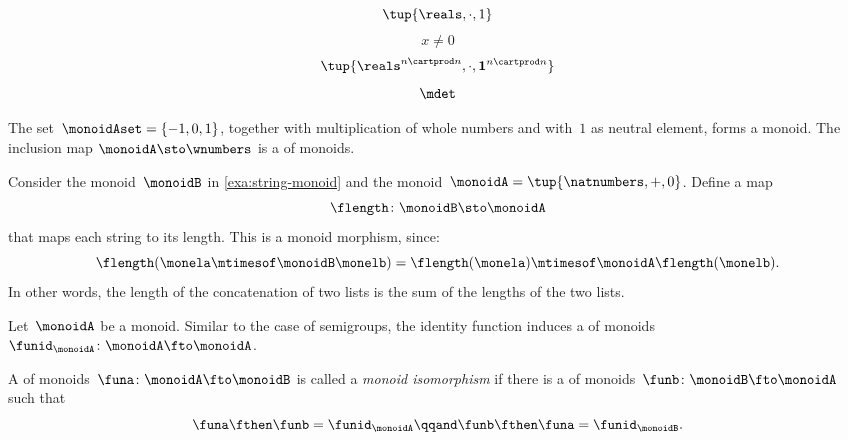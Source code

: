 {\begin{forslides}
        \begin{equation}
            \label{eq:reals-times-one}
            \tup{\reals , \cdot, 1}
        \end{equation}
        \begin{equation}
            \label{eq:reals-times-one-non}
            x \neq 0
        \end{equation}
        \begin{equation}
            \label{eq:matrices-times}
            \tup{\reals^{n\cartprod n}, \cdot, \mathbf{1}^{n\cartprod n}}
        \end{equation}
        \begin{equation}
            \label{eq:det}
            \mdet
        \end{equation}
    \end{forslides}
}%

\begin{example}
    The set~$\monoidAset = \{ -1, 0, 1 \}$, together with multiplication of whole numbers and with~$1$ as neutral element, forms a monoid.
    The inclusion map $\monoidA \sto \wnumbers$ is a \whomo of monoids.
\end{example}

\begin{example}
    \label{exa:string-length}
    Consider the monoid~$\monoidB$ in \cref{exa:string-monoid} and the monoid~$\monoidA=\tup{\natnumbers, +,0}$.
    Define a map
    \begin{equation*}
        \flength \colon \monoidB \sto \monoidA
    \end{equation*}
    that maps each string to its length.
    This is a monoid morphism, since:
    \begin{equation*}
        \flength(\monela \mtimesof\monoidB \monelb)=\flength(\monela)\mtimesof\monoidA \flength(\monelb).
    \end{equation*}
    In other words, the length of the concatenation of two lists is the sum of the lengths of the two lists.
\end{example}

\begin{ctdefinition}
    \label{def:identity-mon-mor}
    Let~$\monoidA$ be a monoid.
    Similar to the case of semigroups, the identity function induces a \whomo of monoids~$\funid_\monoidA\colon \monoidA \fto \monoidA$.
\end{ctdefinition}

\begin{ctdefinition}
    \label{def:monoid-iso}
    A \whomo of monoids~$\funa\colon \monoidA \fto \monoidB$ is called a \emph{monoid isomorphism} if there is a \whomo of monoids~$\funb\colon \monoidB \fto \monoidA$ such that
    \begin{equation*}
        \funa \fthen \funb = \funid_\monoidA \qqand \funb \fthen \funa = \funid_\monoidB.
    \end{equation*}
\end{ctdefinition}

